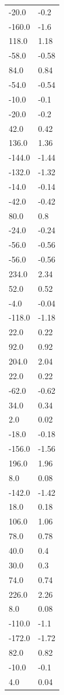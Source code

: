 \begin{longtable}{ll}
-20.0 & -0.2 \\
-160.0 & -1.6 \\
118.0 & 1.18 \\
-58.0 & -0.58 \\
84.0 & 0.84 \\
-54.0 & -0.54 \\
-10.0 & -0.1 \\
-20.0 & -0.2 \\
42.0 & 0.42 \\
136.0 & 1.36 \\
-144.0 & -1.44 \\
-132.0 & -1.32 \\
-14.0 & -0.14 \\
-42.0 & -0.42 \\
80.0 & 0.8 \\
-24.0 & -0.24 \\
-56.0 & -0.56 \\
-56.0 & -0.56 \\
234.0 & 2.34 \\
52.0 & 0.52 \\
-4.0 & -0.04 \\
-118.0 & -1.18 \\
22.0 & 0.22 \\
92.0 & 0.92 \\
204.0 & 2.04 \\
22.0 & 0.22 \\
-62.0 & -0.62 \\
34.0 & 0.34 \\
2.0 & 0.02 \\
-18.0 & -0.18 \\
-156.0 & -1.56 \\
196.0 & 1.96 \\
8.0 & 0.08 \\
-142.0 & -1.42 \\
18.0 & 0.18 \\
106.0 & 1.06 \\
78.0 & 0.78 \\
40.0 & 0.4 \\
30.0 & 0.3 \\
74.0 & 0.74 \\
226.0 & 2.26 \\
8.0 & 0.08 \\
-110.0 & -1.1 \\
-172.0 & -1.72 \\
82.0 & 0.82 \\
-10.0 & -0.1 \\
4.0 & 0.04 \\

\end{longtable}
